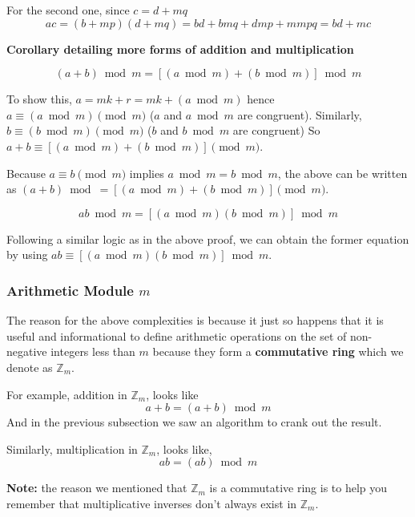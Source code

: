For the second one, since $c = d + mq$
$$
ac = (b + mp)(d + mq) = bd + bmq + dmp + mmpq = bd + mc
$$

\textbf{Corollary detailing more forms of addition and multiplication}

\begin{equation}
    (a+b) \bmod m = [(a \bmod m) + (b \bmod m)] \bmod m
\end{equation}

To show this,
$a = mk + r = mk + (a \bmod m)$ hence
$a \equiv (a \bmod m) \pmod m$ ($a$ and $a \bmod m$ are congruent).
Similarly, $b \equiv (b \bmod m) \pmod m$ ($b$ and $b \bmod m$ are congruent)
So $a + b \equiv [(a \bmod m) + (b \bmod m)] \pmod m$.

Because $a \equiv b \pmod m$ implies $a \bmod m = b \bmod m$, the above can be written as
$(a+b) \bmod = [(a \bmod m) + (b \bmod m)] \pmod m$.

\begin{equation}
    ab \bmod m = [(a \bmod m)(b \bmod m)] \bmod m
\end{equation}

Following a similar logic as in the above proof, we can obtain the former equation by using $ab \equiv [(a \bmod m)(b \bmod m)] \bmod m$.


\subsubsection{Arithmetic Module $m$}

The reason for the above complexities is because it just so happens that it is useful and informational
to define arithmetic operations on the set of non-negative integers less than $m$ because they form
a \textbf{commutative ring} which we denote as $\mathbb{Z}_m$.

For example, addition in $\mathbb{Z}_m$, looks like
$$
a + b = (a+b) \bmod m
$$
And in the previous subsection we saw an algorithm to crank out the result.

Similarly, multiplication in $\mathbb{Z}_m$, looks like,
$$
ab = (ab) \bmod m
$$

\textbf{Note:} the reason we mentioned that $\mathbb{Z}_m$ is a commutative ring is to help you remember that
multiplicative inverses don't always exist in $\mathbb{Z}_m$.